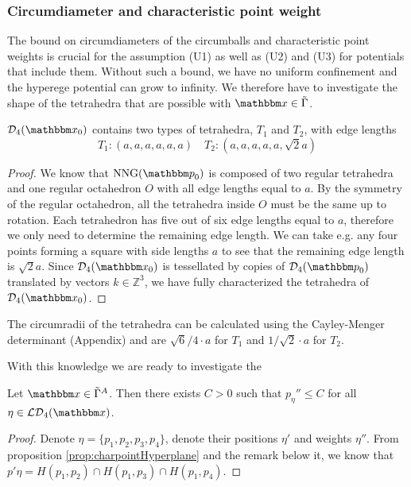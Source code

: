 \begin{remark}
\subsubsection{Circumdiameter and characteristic point weight}
The bound on circumdiameters of the circumballs and characteristic point weights is crucial for the assumption (U1) as well as (U2) and (U3) for potentials that include them. Without such a bound, we have no uniform confinement and the hyperege potential can grow to infinity. We therefore have to investigate the shape of the tetrahedra that are possible with $\x \in \tilde\Gamma$. 

\begin{proposition} $\mathcal D_4(\x_0)$ contains two types of tetrahedra, $T_1$ and $T_2$, with edge lengths
$$T_1: (a,a,a,a,a,a) \quad T_2:(a,a,a,a,a,\sqrt 2a)$$
\end{proposition}
\begin{proof}
We know that $\text{NNG}(\p_0)$ is composed of two regular tetrahedra and one regular octahedron $O$ with all edge lengths equal to $a$. By the symmetry of the regular octahedron, all the tetrahedra inside $O$ must be the same up to rotation. Each tetrahedron has five out of six edge lengths equal to $a$, therefore we only need to determine the remaining edge length. We can take e.g. any four points forming a square with side lengths $a$ to see that the remaining edge length is $\sqrt 2a$.
Since $\mathcal D_4(\x_0)$ is tessellated by copies of $\mathcal D_4(\p_0)$ translated by vectors $k\in\mathbb Z^3$, we have fully characterized the tetrahedra of $\mathcal D_4(\x_0)$. 
\end{proof}

The circumradii of the tetrahedra can be calculated using the Cayley-Menger determinant (Appendix) and are $\sqrt{6}/4 \cdot a$ for $T_1$ and $1/\sqrt{2}\cdot a$ for $T_2$.

With this knowledge we are ready to investigate the 
\begin{proposition}
Let $\x \in \tilde\Gamma^A$. Then there exists $C>0$ such that $p_\eta'' \leq C$ for all $\eta \in \mathcal {LD}_4(\x)$. 
\end{proposition}
\begin{proof}
Denote $\eta=\{p_1,p_2,p_3,p_4\}$, denote their positions $\eta'$ and weights $\eta''$. From proposition \ref{prop:charpointHyperplane} and the remark below it, we know that $p'\eta = H(p_1,p_2)\cap H(p_1,p_3) \cap H(p_1,p_4)$.


\end{proof}
\end{remark}
